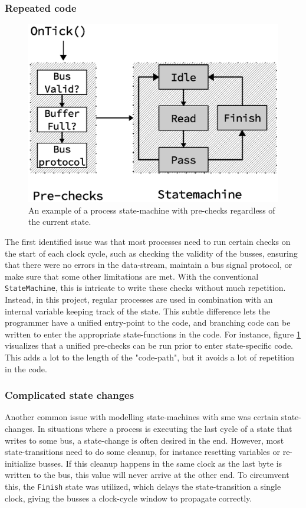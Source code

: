 \subsubsection{Repeated code}
\begin{figure}
\centering
\includegraphics[scale=0.45]{discussion/fsm_prestates.eps}
\caption{An example of a process state-machine with pre-checks regardless of
the current state.}
\label{fig:fsm_prestates}
\end{figure}

The first identified issue was that most processes need to run certain checks on the
start of each clock cycle, such as checking the validity of the busses,
ensuring that there were no errors in the data-stream, maintain a bus signal
protocol, or make sure that some other limitations are met.
With the conventional \texttt{StateMachine}, this is intricate to write these
checks without much repetition. Instead, in this project, regular processes are
used in combination with an internal variable keeping track of the state.
This subtle difference lets the programmer have a unified entry-point to the
code, and branching code can be written to enter the appropriate
state-functions in the code.
For instance, figure \ref{fig:fsm_prestates} visualizes that a unified
pre-checks can be run prior to enter state-specific code. This adds a lot to
the length of the "code-path", but it avoids a lot of repetition in the code.


\subsubsection{Complicated state changes}
Another common issue with modelling state-machines with \gls{sme} was certain
state-changes. In situations where a process is executing the last cycle of a
state that writes to some bus, a state-change is often desired in the end.
However, most state-transitions need to do some cleanup, for instance resetting
variables or re-initialize busses. If this cleanup happens in the same clock as
the last byte is written to the bus, this value will never arrive at the other
end. To circumvent this, the \texttt{Finish} state was utilized, which delays
the state-transition a single clock, giving the busses a clock-cycle window to
propagate correctly.

